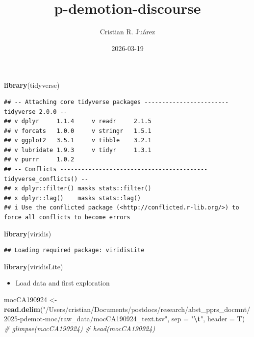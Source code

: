 \documentclass[
]{article}
\title{p-demotion-discourse}
\author{Cristian R. Juárez}
\date{2026-03-19}
\newenvironment{Shaded}{\begin{snugshade}}{\end{snugshade}}
\newcommand{\AttributeTok}[1]{\textcolor[rgb]{0.13,0.29,0.53}{#1}}
\newcommand{\CommentTok}[1]{\textcolor[rgb]{0.56,0.35,0.01}{\textit{#1}}}
\newcommand{\FunctionTok}[1]{\textcolor[rgb]{0.13,0.29,0.53}{\textbf{#1}}}
\newcommand{\NormalTok}[1]{#1}
\newcommand{\OtherTok}[1]{\textcolor[rgb]{0.56,0.35,0.01}{#1}}
\newcommand{\SpecialCharTok}[1]{\textcolor[rgb]{0.81,0.36,0.00}{\textbf{#1}}}
\newcommand{\StringTok}[1]{\textcolor[rgb]{0.31,0.60,0.02}{#1}}
\providecommand{\tightlist}{%
  \setlength{\itemsep}{0pt}\setlength{\parskip}{0pt}}
\begin{document}
\maketitle

\begin{Shaded}
\begin{Highlighting}[]
\FunctionTok{library}\NormalTok{(tidyverse)}
\end{Highlighting}
\end{Shaded}

\begin{verbatim}
## -- Attaching core tidyverse packages ------------------------ tidyverse 2.0.0 --
## v dplyr     1.1.4     v readr     2.1.5
## v forcats   1.0.0     v stringr   1.5.1
## v ggplot2   3.5.1     v tibble    3.2.1
## v lubridate 1.9.3     v tidyr     1.3.1
## v purrr     1.0.2     
## -- Conflicts ------------------------------------------ tidyverse_conflicts() --
## x dplyr::filter() masks stats::filter()
## x dplyr::lag()    masks stats::lag()
## i Use the conflicted package (<http://conflicted.r-lib.org/>) to force all conflicts to become errors
\end{verbatim}

\begin{Shaded}
\begin{Highlighting}[]
\FunctionTok{library}\NormalTok{(viridis)}
\end{Highlighting}
\end{Shaded}

\begin{verbatim}
## Loading required package: viridisLite
\end{verbatim}

\begin{Shaded}
\begin{Highlighting}[]
\FunctionTok{library}\NormalTok{(viridisLite)}
\end{Highlighting}
\end{Shaded}

\begin{itemize}
\tightlist
\item
  Load data and first exploration
\end{itemize}

\begin{Shaded}
\begin{Highlighting}[]
\NormalTok{mocCA190924 }\OtherTok{\textless{}{-}} \FunctionTok{read.delim}\NormalTok{(}\StringTok{"/Users/cristian/Documents/postdocs/research/abst\_pprs\_docmnt/2025{-}pdemot{-}moc/raw\_data/mocCA190924\_text.tsv"}\NormalTok{, }\AttributeTok{sep =} \StringTok{"}\SpecialCharTok{\textbackslash{}t}\StringTok{"}\NormalTok{, }\AttributeTok{header =}\NormalTok{ T)}
\CommentTok{\# glimpse(mocCA190924)}
\CommentTok{\# head(mocCA190924)}
\end{Highlighting}
\end{Shaded}
\end{document}
